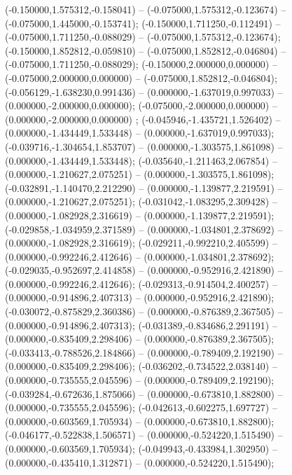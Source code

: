 (-0.150000,1.575312,-0.158041) -- (-0.075000,1.575312,-0.123674) -- (-0.075000,1.445000,-0.153741);
 (-0.150000,1.711250,-0.112491) -- (-0.075000,1.711250,-0.088029) -- (-0.075000,1.575312,-0.123674);
 (-0.150000,1.852812,-0.059810) -- (-0.075000,1.852812,-0.046804) -- (-0.075000,1.711250,-0.088029);
 (-0.150000,2.000000,0.000000) -- (-0.075000,2.000000,0.000000) -- (-0.075000,1.852812,-0.046804);
 (-0.056129,-1.638230,0.991436) -- (0.000000,-1.637019,0.997033) -- (0.000000,-2.000000,0.000000);
 (-0.075000,-2.000000,0.000000) -- (0.000000,-2.000000,0.000000) ;
 (-0.045946,-1.435721,1.526402) -- (0.000000,-1.434449,1.533448) -- (0.000000,-1.637019,0.997033);
 (-0.039716,-1.304654,1.853707) -- (0.000000,-1.303575,1.861098) -- (0.000000,-1.434449,1.533448);
 (-0.035640,-1.211463,2.067854) -- (0.000000,-1.210627,2.075251) -- (0.000000,-1.303575,1.861098);
 (-0.032891,-1.140470,2.212290) -- (0.000000,-1.139877,2.219591) -- (0.000000,-1.210627,2.075251);
 (-0.031042,-1.083295,2.309428) -- (0.000000,-1.082928,2.316619) -- (0.000000,-1.139877,2.219591);
 (-0.029858,-1.034959,2.371589) -- (0.000000,-1.034801,2.378692) -- (0.000000,-1.082928,2.316619);
 (-0.029211,-0.992210,2.405599) -- (0.000000,-0.992246,2.412646) -- (0.000000,-1.034801,2.378692);
 (-0.029035,-0.952697,2.414858) -- (0.000000,-0.952916,2.421890) -- (0.000000,-0.992246,2.412646);
 (-0.029313,-0.914504,2.400257) -- (0.000000,-0.914896,2.407313) -- (0.000000,-0.952916,2.421890);
 (-0.030072,-0.875829,2.360386) -- (0.000000,-0.876389,2.367505) -- (0.000000,-0.914896,2.407313);
 (-0.031389,-0.834686,2.291191) -- (0.000000,-0.835409,2.298406) -- (0.000000,-0.876389,2.367505);
 (-0.033413,-0.788526,2.184866) -- (0.000000,-0.789409,2.192190) -- (0.000000,-0.835409,2.298406);
 (-0.036202,-0.734522,2.038140) -- (0.000000,-0.735555,2.045596) -- (0.000000,-0.789409,2.192190);
 (-0.039284,-0.672636,1.875066) -- (0.000000,-0.673810,1.882800) -- (0.000000,-0.735555,2.045596);
 (-0.042613,-0.602275,1.697727) -- (0.000000,-0.603569,1.705934) -- (0.000000,-0.673810,1.882800);
 (-0.046177,-0.522838,1.506571) -- (0.000000,-0.524220,1.515490) -- (0.000000,-0.603569,1.705934);
 (-0.049943,-0.433984,1.302950) -- (0.000000,-0.435410,1.312871) -- (0.000000,-0.524220,1.515490);
